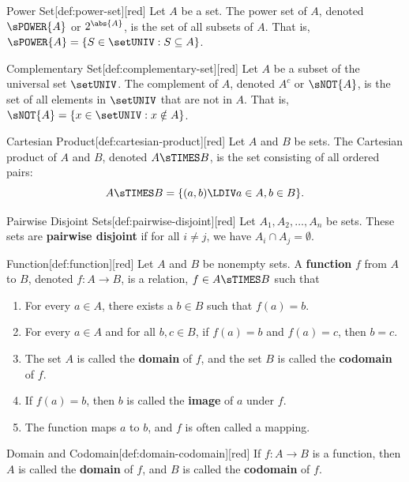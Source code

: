 \begin{define}{Power Set}[def:power-set][red]
  Let $A$ be a set. The power set of $A$, denoted $\sPOWER{A}$ or $2^{\abs{A}}$, is the set of all subsets of $A$. That is, $\sPOWER{A} = \{S\in\setUNIV : S \subseteq A\}$.
\end{define}
\begin{define}{Complementary Set}[def:complementary-set][red]
  Let $A$ be a subset of the universal set $\setUNIV$. The complement of $A$, 
  denoted $A^c$ or $\sNOT{A}$, is the set of all elements in $\setUNIV$ that are not in $A$. 
  That is, $\sNOT{A} = \{x \in \setUNIV : x \notin A\}$.
\end{define}
\begin{define}{Cartesian Product}[def:cartesian-product][red]
  Let $A$ and $B$ be sets. The Cartesian product of $A$ and $B$, denoted $A \sTIMES B$, is the set consisting of all ordered pairs:
  \[
  A \sTIMES B = \{(a, b) \LDIV a \in A, b \in B\}.
  \]
\end{define}
\begin{define}{Pairwise Disjoint Sets}[def:pairwise-disjoint][red]
  Let $A_1, A_2, \ldots, A_n$ be sets. These sets are \textbf{pairwise disjoint} if for all $i \neq j$, we have $A_i \cap A_j = \emptyset$.
\end{define}


\newpage

\begin{define}{Function}[def:function][red]
  Let $A$ and $B$ be nonempty sets. A \textbf{function} $f$ from $A$ to $B$, denoted $f : A \to B$, 
  is a relation, $f\in A\sTIMES B$ such that 
  \begin{enumerate}
    \item For every $a \in A$, there exists a $b \in B$ such that $f(a) = b$.
    \item For every $a \in A$ and for all $b, c \in B$, if $f(a) = b$ and $f(a) = c$, then $b = c$.
    \item The set $A$ is called the \textbf{domain} of $f$, 
    and the set $B$ is called the \textbf{codomain} of $f$.
    \item If $f(a)=b$, then $b$ is called the \textbf{image} of $a$ under $f$.
    \item The function maps $a$ to $b$, and $f$ is often called a mapping.
  \end{enumerate}
\end{define}

\begin{define}{Domain and Codomain}[def:domain-codomain][red]
  If $f : A \to B$ is a function, then $A$ is called the \textbf{domain} of $f$, and $B$ is called the \textbf{codomain} of $f$.
\end{define}

